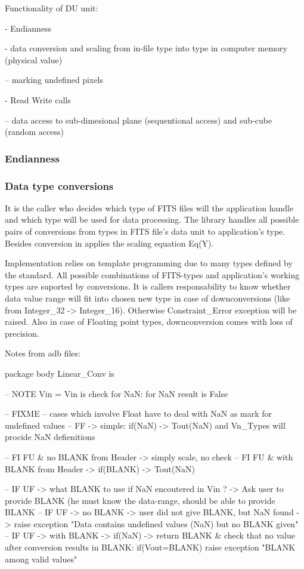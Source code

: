 \documentclass[a4paper,10pt]{article}
\begin{document}
Functionality of DU unit:

- Endianness

- data conversion and scaling from in-file type into type in computer memory (physical value)

-- marking undefined pixels

- Read Write calls

-- data access to sub-dimesional plane (sequentional access) and sub-cube (random access)



\subsubsection{Endianness}

\subsubsection{Data type conversions}

It is the caller who decides which type of FITS files will the application handle and
which type will be used for data processing. The library handles all possible pairs of
conversions from types in FITS file's data unit to application's type.
Besides conversion in applies the scaling equation Eq(Y).

Implementation relies on template programming due to many types defined by the standard. 
All possible combinations of FITS-types and application's working types are suported
by conversions. It is callers responsability to know whether data value range will fit
into chosen new type in case of downconversions (like from Integer\_32 -> Integer\_16).
Otherwise Constraint\_Error exception will be raised.
Also in case of Floating point types, downconversion comes with loss of precision.

Notes from adb files:

package body Linear\_Conv is

-- NOTE Vin = Vin is check for NaN: for NaN result is False

-- FIXME
    -- cases which involve Float have to deal with NaN as mark for undefined values
    -- FF -> simple: if(NaN) -> Tout(NaN) and Vn\_Types will procide NaN defienitions

    -- FI FU \& no   BLANK from Header -> simply scale, no check
    -- FI FU \& with BLANK from Header -> if(BLANK) -> Tout(NaN)

    -- IF UF -> what BLANK to use if NaN encoutered in Vin ? -> Ask user to provide BLANK (he must know the data-range, should be able to provide BLANK
    -- IF UF -> no   BLANK -> user did not give BLANK, but NaN found -> raise exception "Data contains undefined values (NaN) but no BLANK given"
    -- IF UF -> with BLANK -> if(NaN) -> return BLANK \& check that no value after conversion results in BLANK: if(Vout=BLANK) raise exception "BLANK among valid values"
\end{document}
